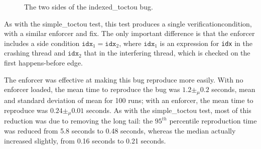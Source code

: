 \begin{figure}
  \caption{The two sides of the indexed\_toctou bug.}
  \label{fig:eval:indexed_toctou}
\end{figure}

As with the simple\_toctou test, this test produces a single
\gls{verificationcondition}, with a similar enforcer and fix.  The
only important difference is that the enforcer includes a side
condition $\mathtt{idx}_1 = \mathtt{idx}_2$, where $\mathtt{idx}_1$ is
an expression for \texttt{idx} in the crashing thread and
$\mathtt{idx}_2$ that in the interfering thread, which is checked on
the first happens-before edge.

The enforcer was effective at making this bug reproduce more easily.
With no enforcer loaded, the mean time to reproduce the bug was $1.2
\pm_\mu 0.2$ seconds, mean and standard deviation of mean for 100
runs; with an enforcer, the mean time to reproduce was $0.24 \pm_\mu
0.01$ seconds.  As with the simple\_toctou test, most of this
reduction was due to removing the long tail: the $95^{th}$ percentile
reproduction time was reduced from 5.8 seconds to 0.48 seconds,
whereas the median actually increased slightly, from 0.16 seconds to
0.21 seconds.  

